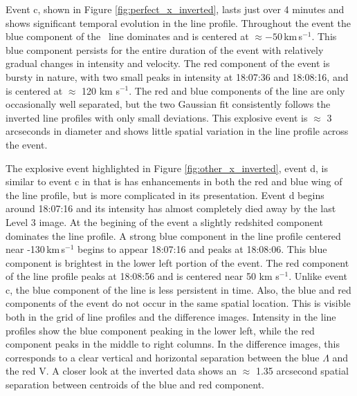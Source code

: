 		Event c, shown in Figure \ref{fig:perfect_x_inverted}, lasts just over 4 minutes and shows significant temporal evolution in the line profile.
		Throughout the event the blue component of the \ov \ line dominates and is centered at $\approx -50$\,km\,s$^{-1}$.
		This blue component persists for the entire duration of the event with %
		relatively gradual changes in intensity and velocity.
		The red component of the event is bursty in nature, with two small peaks in intensity at 18:07:36 and 18:08:16, and is centered at $\approx$ 120 km s$^{-1}$. 
	    The red and blue components of the line are only occasionally well separated, but the two Gaussian fit consistently follows the inverted line profiles with only small deviations.
		This explosive event is $\approx$ 3 arcseconds in diameter and shows little spatial variation in the line profile across the event.
		
		The explosive event highlighted in Figure \ref{fig:other_x_inverted}, event d, is similar to event c in that is has enhancements in both the red and blue wing of the line profile, but is more complicated in its presentation.
		Event d  begins around 18:07:16 and its intensity has almost completely died away by the last Level 3 image.
		At the begining of the event a slightly redshited component dominates the line profile.
		A strong blue component in the line profile centered near -130\,km\,s$^{-1}$ begins to appear 18:07:16 and peaks at 18:08:06. 
		This blue component is brightest in the lower left portion of the event.
		The red component of the line profile peaks at 18:08:56 and is centered near 50 km s$^{-1}$.
		Unlike event c, the blue component of the line is less persistent in time.
		Also, the blue and red components of the event do not occur in the same spatial location.
		This is visible both in the grid of line profiles and the difference images.
		Intensity in the line profiles show the blue component peaking in the lower left, while the red component peaks in the middle to right columns.
		In the difference images, this corresponds to a clear vertical and horizontal separation between the blue $\Lambda$ and the red V. 
		A closer look at the inverted data shows an $\approx$ 1.35 arcsecond spatial separation between centroids of the blue and red component.

